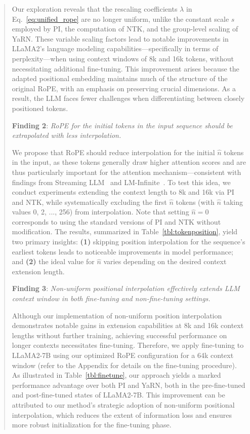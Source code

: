 \begin{abstract}
Our exploration reveals that the rescaling coefficients $\lambda$ in Eq.~\ref{eq:unified_rope} are no longer uniform, unlike the constant scale $s$ employed by PI, the computation of NTK, and the group-level scaling of YaRN. These variable scaling factors lead to notable improvements in LLaMA2's language modeling capabilities—specifically in terms of perplexity—when using context windows of 8k and 16k tokens, without necessitating additional fine-tuning. This improvement arises because the adapted positional embedding maintains much of the structure of the original RoPE, with an emphasis on preserving crucial dimensions. As a result, the LLM faces fewer challenges when differentiating between closely positioned tokens.

\textbf{Finding 2}: \textit{RoPE for the initial tokens in the input sequence should be extrapolated with less interpolation.} 

We propose that RoPE should reduce interpolation for the initial $\hat{n}$ tokens in the input, as these tokens generally draw higher attention scores and are thus particularly important for the attention mechanism—consistent with findings from Streaming LLM~\cite{streamingllm} and LM-Infinite~\cite{han2023lminfinite}. To test this idea, we conduct experiments extending the context length to 8k and 16k via PI and NTK, while systematically excluding the first $\hat{n}$ tokens (with $\hat n$ taking values 0, 2, ..., 256) from interpolation. Note that setting $\hat n=0$ corresponds to using the standard versions of PI and NTK without modification. The results, summarized in Table~\ref{tbl:tokenposition}, yield two primary insights: \textbf{(1)} skipping position interpolation for the sequence's earliest tokens leads to noticeable improvements in model performance; and \textbf{(2)} the ideal value for $\hat{n}$ varies depending on the desired context extension length.

\textbf{Finding 3}: \textit{Non-uniform positional interpolation effectively extends LLM context window in both fine-tuning and non-fine-tuning settings.} 

Although our implementation of non-uniform position interpolation demonstrates notable gains in extension capabilities at 8k and 16k context lengths without further training, achieving successful performance on longer contexts necessitates fine-tuning. Therefore, we apply fine-tuning to LLaMA2-7B using our optimized RoPE configuration for a 64k context window (refer to the Appendix for details on the fine-tuning procedure). As illustrated in Table~\ref{tbl:finetune}, our approach yields a marked performance advantage over both PI and YaRN, both in the pre-fine-tuned and post-fine-tuned states of LLaMA2-7B. This improvement can be attributed to our method's strategic adoption of non-uniform positional interpolation, which reduces the extent of information loss and ensures more robust initialization for the fine-tuning phase.


\end{abstract}
